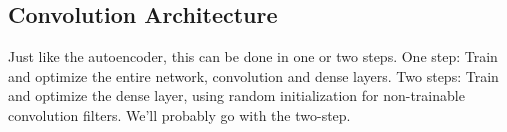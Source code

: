 






\subsection{Convolution Architecture}

Just like the autoencoder, this can be done in one or two steps. One step: Train and optimize the entire network, convolution and dense layers. Two steps: Train and optimize the dense layer, using random initialization for non-trainable convolution filters. We'll probably go with the two-step.

